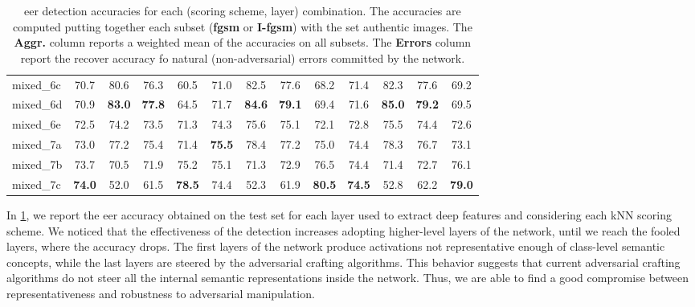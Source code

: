 \begin{table}
\begin{tabularx}{\linewidth}{Xcccccccccccc}
mixed\_6c        &          70.7 &          80.6 &          76.3 &          60.5 &          71.0 &          82.5 &          77.6 &          68.2 &          71.4 &          82.3 &          77.6 &          69.2 \\
mixed\_6d        &          70.9 & \textbf{83.0} & \textbf{77.8} &          64.5 &          71.7 & \textbf{84.6} & \textbf{79.1} &          69.4 &          71.6 & \textbf{85.0} & \textbf{79.2} &          69.5 \\
mixed\_6e        &          72.5 &          74.2 &          73.5 &          71.3 &          74.3 &          75.6 &          75.1 &          72.1 &          72.8 &          75.5 &          74.4 &          72.6 \\
mixed\_7a        &          73.0 &          77.2 &          75.4 &          71.4 & \textbf{75.5} &          78.4 &          77.2 &          75.0 &          74.4 &          78.3 &          76.7 &          73.1 \\
mixed\_7b        &          73.7 &          70.5 &          71.9 &          75.2 &          75.1 &          71.3 &          72.9 &          76.5 &          74.4 &          71.4 &          72.7 &          76.1 \\
mixed\_7c        & \textbf{74.0} &          52.0 &          61.5 & \textbf{78.5} &          74.4 &          52.3 &          61.9 & \textbf{80.5} & \textbf{74.5} &          52.8 &          62.2 & \textbf{79.0} \\
\bottomrule
\end{tabularx}
\caption{\Gls{eer} detection accuracies for each (scoring scheme, layer) combination.
The accuracies are computed putting together each subset (\textbf{\gls{fgsm}} or \textbf{I-\gls{fgsm}}) with the set authentic images.
The \textbf{Aggr.} column reports a weighted mean of the accuracies on all subsets.
The \textbf{Errors} column report the recover accuracy fo natural (non-adversarial) errors committed by the network.}
\label{tab:adv:i3-eer}
\end{table}

In \ref{tab:adv:i3-eer}, we report the \gls{eer} accuracy obtained on the test set for each layer used to extract deep features and considering each kNN scoring scheme.
We noticed that the effectiveness of the detection increases adopting higher-level layers of the network, until we reach the fooled layers, where the accuracy drops.
The first layers of the network produce activations not representative enough of class-level semantic concepts, while the last layers are steered by the adversarial crafting algorithms.
This behavior suggests that current adversarial crafting algorithms do not steer all the internal semantic representations inside the network.
Thus, we are able to find a good compromise between representativeness and robustness to adversarial manipulation.

